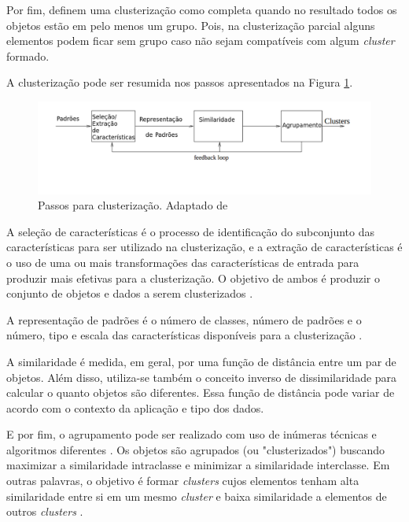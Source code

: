 Por fim,  definem uma clusterização como completa quando no resultado todos os objetos estão em pelo menos um grupo. 
Pois, na clusterização parcial alguns elementos podem ficar sem grupo caso não sejam compatíveis com algum \textit{cluster} formado.

A clusterização pode ser resumida nos passos apresentados na Figura \ref{fig:tasks_clustering}.

\begin{figure}[h!]
\centering
\includegraphics[scale=0.6]{figuras/tasks_clustering.png}
\caption{Passos para clusterização. Adaptado de }
\label{fig:tasks_clustering}
\end{figure}

A seleção de características é o processo de identificação do subconjunto das características para ser utilizado na clusterização, 
e a extração de características é o uso de uma ou mais transformações das características de entrada para 
produzir mais efetivas para a clusterização. O objetivo de ambos é produzir o conjunto de objetos e dados a serem clusterizados \cite{clustering_review}.

A representação de padrões é o número de classes, número de padrões e o número, tipo e escala
das características disponíveis para a clusterização \cite{clustering_review}.

A similaridade é medida, em geral, por uma função de distância entre um par de objetos. Além disso, utiliza-se também
o conceito inverso de dissimilaridade para calcular o quanto objetos são diferentes. Essa função de distância pode variar de acordo 
com o contexto da aplicação e tipo dos dados. 

E por fim, o agrupamento pode ser realizado com uso de inúmeras técnicas e algoritmos diferentes \cite{clustering_review}.
Os objetos são agrupados (ou "clusterizados") buscando maximizar a similaridade intraclasse e minimizar a similaridade interclasse.
Em outras palavras, o objetivo é formar \textit{clusters} cujos elementos tenham alta similaridade entre si em um mesmo \textit{cluster} 
e baixa similaridade a elementos de outros \textit{clusters} \cite{han2011data}.

